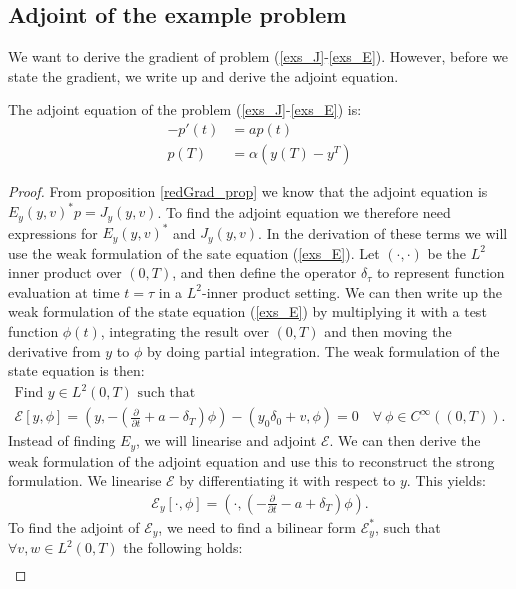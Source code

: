 \subsection{Adjoint of the example problem}
We want to derive the gradient of problem (\ref{exs_J}-\ref{exs_E}). However, before we state the gradient, we write up and derive the adjoint equation.
\begin{proposition} \label{adjoint_eq_prop}
The adjoint equation of the problem (\ref{exs_J}-\ref{exs_E}) is:
\begin{align}     
-p'(t) &= ap(t) \label{exs_adjoint_eq}\\
p(T) &= \alpha(y(T)-y^T)   \label{exs_adjoint_ic}  
\end{align}
\end{proposition}
\begin{proof}
From proposition \ref{redGrad_prop} we know that the adjoint equation is $E_y(y,v)^{*}p=J_y(y,v)$. To find the adjoint equation we therefore need expressions for $E_y(y,v)^{*}$ and $J_y(y,v)$. In the derivation of these terms we will use the weak formulation of the sate equation (\ref{exs_E}). Let $(\cdot,\cdot)$ be the $L^2$ inner product over $(0,T)$, and then define the operator $\delta_{\tau}$ to represent function evaluation at time $t=\tau$ in a $L^2$-inner product setting. We can then write up the weak formulation of the state equation (\ref{exs_E}) by multiplying it with a test function $\phi(t)$, integrating the result over $(0,T)$ and then moving the derivative from $y$ to $\phi$ by doing partial integration. The weak formulation of the state equation is then:
\begin{gather*}
\textrm{Find $y \in L^2(0,T)$ such that}\\
\mathcal{E}[y,\phi]= (y,-(\frac{\partial}{\partial t}+a- \delta_T)\phi) -(y_0\delta_0+v,\phi)=0\quad	 \forall \ \phi \in C^{\infty}((0,T)).
\end{gather*}
Instead of finding $E_y$, we will linearise and adjoint $\mathcal{E}$. We can then derive the weak formulation of the adjoint equation and use this to reconstruct the strong formulation. We linearise $\mathcal{E}$ by differentiating it with respect to $y$. This yields:
\begin{align*}
\mathcal{E}_y[\cdot,\phi]=(\cdot,(-\frac{\partial}{\partial t} - a + \delta_T)\phi).
\end{align*}
To find the adjoint of $\mathcal{E}_y$, we need to find a bilinear form $\mathcal{E}_y^*$, such that $\forall v,w\in L^2(0,T)$ the following holds:
\begin{align*}

\end{align*}
\end{proof}
